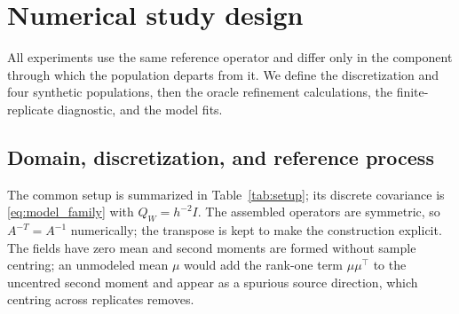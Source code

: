 \documentclass[11pt]{article}
\numberwithin{table}{section}
\numberwithin{figure}{section}
\begin{document}
\section{Numerical study design}
\label{sec:numerical_design}

All experiments use the same reference operator and differ only in the component through which the population departs from it. We define the discretization and four synthetic populations, then the oracle refinement calculations, the finite-replicate diagnostic, and the model fits.

\subsection{Domain, discretization, and reference process}
\label{sec:design_setup}

The common setup is summarized in Table~\ref{tab:setup}; its discrete covariance is \eqref{eq:model_family} with $Q_W=h^{-2}I$. The assembled operators are symmetric, so $A^{-T}=A^{-1}$ numerically; the transpose is kept to make the construction explicit. The fields have zero mean and second moments are formed without sample centring; an unmodeled mean $\mu$ would add the rank-one term $\mu\mu^\top$ to the uncentred second moment and appear as a spurious source direction, which centring across replicates removes.
\end{document}
